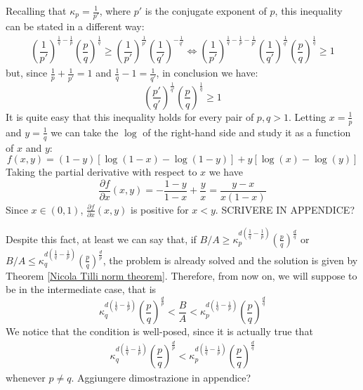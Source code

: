 \documentclass[corpo=11pt, stile=classica, tipotesi=custom,
greek, evenboxes, english]{toptesi}
\numberwithin{equation}{chapter}
\newcommand{\pdfrac}[2]{\dfrac{\partial #1}{\partial #2}}
\newcommand{\pfrac}[2]{\frac{\partial #1}{\partial #2}}
\begin{document}
Recalling that $\kappa_p =\frac{1}{p'}$, where $p'$ is the conjugate exponent of $p$, this inequality can be stated in a different way:
\begin{align*}
	\left(\dfrac{1}{p'}\right)^{\frac{1}{q}-\frac{1}{p}}\left(\dfrac{p}{q}\right)^{\frac{1}{q}} \geq \left(\dfrac{1}{p'}\right)^{\frac{1}{p'}} \left(\dfrac{1}{q'}\right)^{-\frac{1}{q'}}\iff \left(\dfrac{1}{p'}\right)^{\frac{1}{q}-\frac{1}{p} - \frac{1}{p'}}\left(\dfrac{1}{q'}\right)^{\frac{1}{q'}} \left(\dfrac{p}{q}\right)^{\frac{1}{q}} \geq 1
\end{align*}
but, since $\frac{1}{p}+\frac{1}{p'}=1$ and $\frac{1}{q} - 1 = \frac{1}{q'}$, in conclusion we have:
\begin{equation*}
	\left(\dfrac{p'}{q'}\right)^{\frac1{q'}} \left(\dfrac{p}{q}\right)^{\frac{1}{q}} \geq 1
\end{equation*}
{\color{blue}It is quite easy that this inequality holds for every pair of $p,q>1$. Letting $x=\frac{1}{p}$ and $y=\frac{1}{q}$ we can take the $\log$ of the right-hand side and study it as a function of $x$ and $y$:
	\begin{equation*}
		f(x,y) = (1-y)\left[\log(1-x) - \log(1-y)\right] + y\left[\log(x) - \log(y)\right]
	\end{equation*}
	Taking the partial derivative with respect to $x$ we have
	\begin{equation*}
		\pdfrac{f}{x}(x,y) = -\dfrac{1-y}{1-x} + \dfrac{y}{x} = \dfrac{y-x}{x(1-x)}
	\end{equation*}
	Since $x \in (0,1)$, $\pfrac{f}{x}(x,y)$ is positive for $x<y$. SCRIVERE IN APPENDICE?}

Despite this fact, at least we can say that, if $B/A \geq \kappa_p^{d\left(\frac{1}{q}-\frac{1}{p}\right)}\left(\frac{p}{q}\right)^{\frac{d}{q}}$ or $B/A \leq \kappa_q^{d\left(\frac{1}{q}-\frac{1}{p}\right)}\left(\frac{p}{q}\right)^{\frac{d}{p}}$, the problem is already solved and the solution is given by Theorem \ref{Nicola Tilli norm theorem}. Therefore, from now on, we will suppose to be in the intermediate case, that is
\begin{equation}\label{intermediate regime}
	\kappa_q^{d\left(\frac{1}{q}-\frac{1}{p}\right)} \left(\dfrac{p}{q}\right)^{\frac{d}{p}} < \dfrac{B}{A} < \kappa_p^{d\left(\frac{1}{q}-\frac{1}{p}\right)} \left(\dfrac{p}{q}\right)^{\frac{d}{q}}
\end{equation}
We notice that the condition is well-posed, since it is actually true that
\begin{align*}
	\kappa_q^{d\left(\frac{1}{q}-\frac{1}{p}\right)} \left(\dfrac{p}{q}\right)^{\frac{d}{p}} < \kappa_p^{d\left(\frac{1}{q}-\frac{1}{p}\right)} \left(\dfrac{p}{q}\right)^{\frac{d}{q}}
\end{align*}
whenever $p \neq q$. {\color{blue} Aggiungere dimostrazione in appendice?}
\end{document}

